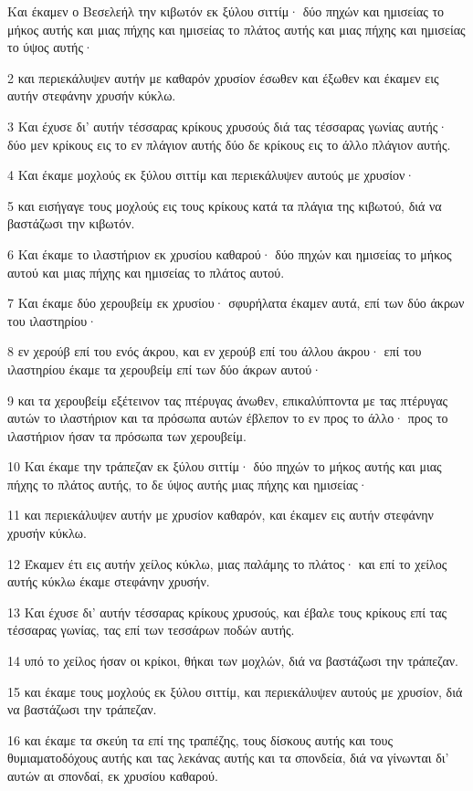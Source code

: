\par Και έκαμεν ο Βεσελεήλ την κιβωτόν εκ ξύλου σιττίμ· δύο πηχών και ημισείας το μήκος αυτής και μιας πήχης και ημισείας το πλάτος αυτής και μιας πήχης και ημισείας το ύψος αυτής·
\par 2 και περιεκάλυψεν αυτήν με καθαρόν χρυσίον έσωθεν και έξωθεν και έκαμεν εις αυτήν στεφάνην χρυσήν κύκλω.
\par 3 Και έχυσε δι' αυτήν τέσσαρας κρίκους χρυσούς διά τας τέσσαρας γωνίας αυτής· δύο μεν κρίκους εις το εν πλάγιον αυτής δύο δε κρίκους εις το άλλο πλάγιον αυτής.
\par 4 Και έκαμε μοχλούς εκ ξύλου σιττίμ και περιεκάλυψεν αυτούς με χρυσίον·
\par 5 και εισήγαγε τους μοχλούς εις τους κρίκους κατά τα πλάγια της κιβωτού, διά να βαστάζωσι την κιβωτόν.
\par 6 Και έκαμε το ιλαστήριον εκ χρυσίου καθαρού· δύο πηχών και ημισείας το μήκος αυτού και μιας πήχης και ημισείας το πλάτος αυτού.
\par 7 Και έκαμε δύο χερουβείμ εκ χρυσίου· σφυρήλατα έκαμεν αυτά, επί των δύο άκρων του ιλαστηρίου·
\par 8 εν χερούβ επί του ενός άκρου, και εν χερούβ επί του άλλου άκρου· επί του ιλαστηρίου έκαμε τα χερουβείμ επί των δύο άκρων αυτού·
\par 9 και τα χερουβείμ εξέτεινον τας πτέρυγας άνωθεν, επικαλύπτοντα με τας πτέρυγας αυτών το ιλαστήριον και τα πρόσωπα αυτών έβλεπον το εν προς το άλλο· προς το ιλαστήριον ήσαν τα πρόσωπα των χερουβείμ.
\par 10 Και έκαμε την τράπεζαν εκ ξύλου σιττίμ· δύο πηχών το μήκος αυτής και μιας πήχης το πλάτος αυτής, το δε ύψος αυτής μιας πήχης και ημισείας·
\par 11 και περιεκάλυψεν αυτήν με χρυσίον καθαρόν, και έκαμεν εις αυτήν στεφάνην χρυσήν κύκλω.
\par 12 Έκαμεν έτι εις αυτήν χείλος κύκλω, μιας παλάμης το πλάτος· και επί το χείλος αυτής κύκλω έκαμε στεφάνην χρυσήν.
\par 13 Και έχυσε δι' αυτήν τέσσαρας κρίκους χρυσούς, και έβαλε τους κρίκους επί τας τέσσαρας γωνίας, τας επί των τεσσάρων ποδών αυτής.
\par 14 υπό το χείλος ήσαν οι κρίκοι, θήκαι των μοχλών, διά να βαστάζωσι την τράπεζαν.
\par 15 και έκαμε τους μοχλούς εκ ξύλου σιττίμ, και περιεκάλυψεν αυτούς με χρυσίον, διά να βαστάζωσι την τράπεζαν.
\par 16 και έκαμε τα σκεύη τα επί της τραπέζης, τους δίσκους αυτής και τους θυμιαματοδόχους αυτής και τας λεκάνας αυτής και τα σπονδεία, διά να γίνωνται δι' αυτών αι σπονδαί, εκ χρυσίου καθαρού.

